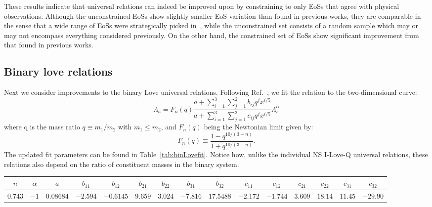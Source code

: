 \documentclass[prd,twocolumn,nofootinbib,superscriptaddress,amsmath,amssymb]{revtex4-1}
\begin{document}
These results indicate that universal relations can indeed be improved upon by constraining to only EoSs that agree with physical observations.
Although the unconstrained EoSs show slightly smaller EoS variation than found in previous works, they are comparable in the sense that a wide range of EoSs were strategically picked in~\cite{Yagi:ILQ}, while the unconstrained set consists of a random sample which may or may not encompass everything considered previously.
On the other hand, the constrained set of EoSs show significant improvement from that found in previous 
works.

\subsection{Binary love relations}\label{sec:binary}
Next we consider improvements to the binary Love universal relations.
Following Ref.~\cite{Yagi:binLove}, we fit the relation to the two-dimensional curve:
\begin{equation}\label{eq:binLovefit}
\Lambda_a=F_n(q) \frac{a+ \sum_{i=1}^3 \sum_{j=1}^2 b_{ij}q^j x^{i/5}}{a+ \sum_{i=1}^3 \sum_{j=1}^2 c_{ij}q^j x^{i/5}} \Lambda_s^{\alpha}
\end{equation}
where q is the mass ratio $q \equiv m_1/m_2$ with $m_1 \leq m_2$, and $F_n(q)$ being the Newtonian limit given by:
\begin{equation}
F_n(q) \equiv \frac{1-q^{10/(3-n)}}{1+q^{10/(3-n)}}.
\end{equation}
The updated fit parameters can be found in Table~\ref{tab:binLovefit}.
Notice how, unlike the individual NS I-Love-Q universal relations, these relations also depend on the ratio of constituent masses in the binary system.
\begin{table*}[ht!]
\centering
\caption{
Updated fit parameters for the binary Love universal relations, as given by the curve found in Eq.~\ref{eq:binLovefit}.
}\label{tab:binLovefit}
\addtolength{\tabcolsep}{1pt} 
\begin{tabular}{ c  c  c  c  c  c  c  c  c  c  c  c  c  c  c} 
 \hline
 \hline
 $n$ & $\alpha$ & $a$ & $b_{11}$ & $b_{12}$ & $b_{21}$ & $b_{22}$ & $b_{31}$ & $b_{32}$ & $c_{11}$ & $c_{12}$ & $c_{21}$ & $c_{22}$ & $c_{31}$ & $c_{32}$\\
 \hline
 $0.743$ & $-1$ & $0.08684$ & $-2.594$ & $-0.6145$ & $9.659$ & $3.024$ & $-7.816$ & $17.5488$ & $-2.172$ & $-1.744$ & $3.609$ & $18.14$ & $11.45$ & $-29.90$\\
\hline
 \hline
\end{tabular}
\addtolength{\tabcolsep}{-1pt}
\end{table*}
\end{document}
